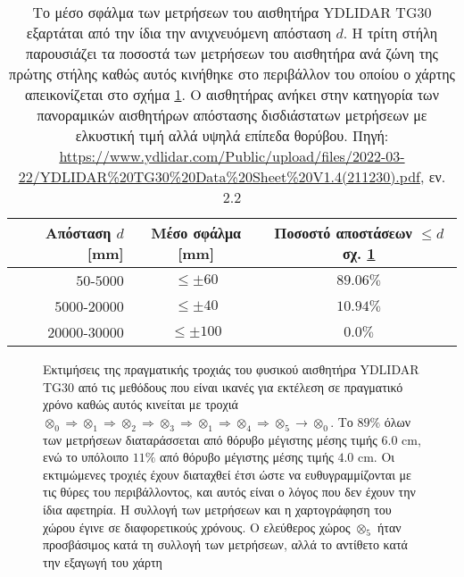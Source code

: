 \begin{table}[h]\centering \vspace{0.5cm}
  \begin{tabular}{rcc}
    Απόσταση $d$ [mm]   & Μέσο σφάλμα [mm]    & Ποσοστό αποστάσεων $\leq d$ σχ. \ref{fig:02_05_04:03} \\ \toprule
    $50$-$5000$         & $\leq \pm 60$       & $89.06\%$  \\
    $5000$-$20000$      & $\leq \pm 40$       & $10.94\%$  \\
    $20000$-$30000$     & $\leq \pm 100$      & $0.0\%$    \\  \bottomrule
  \end{tabular}
  \caption{\small Το μέσο σφάλμα των μετρήσεων του αισθητήρα YDLIDAR TG30
           εξαρτάται από την ίδια την ανιχνευόμενη απόσταση $d$. Η τρίτη στήλη
           παρουσιάζει τα ποσοστά των μετρήσεων του αισθητήρα ανά ζώνη της
           πρώτης στήλης καθώς αυτός κινήθηκε στο περιβάλλον του οποίου ο
           χάρτης απεικονίζεται στο σχήμα \ref{fig:02_05_04:03}. Ο αισθητήρας
           ανήκει στην κατηγορία των πανοραμικών αισθητήρων απόστασης
           δισδιάστατων μετρήσεων με ελκυστική τιμή αλλά υψηλά επίπεδα
           θορύβου. Πηγή: \url{https://www.ydlidar.com/Public/upload/files/2022-03-22/YDLIDAR\%20TG30\%20Data\%20Sheet\%20V1.4(211230).pdf}, εν. 2.2}
  \label{tbl:02:05_04:tg30}
\end{table}

\begin{figure}[]\centering
  
  \vspace{-0.5cm}
  \caption{\small Εκτιμήσεις της πραγματικής τροχιάς του φυσικού αισθητήρα
           YDLIDAR TG30 από τις μεθόδους που είναι ικανές για εκτέλεση σε
           πραγματικό χρόνο καθώς αυτός κινείται με τροχιά $\otimes_0
           \Rightarrow \otimes_1 \Rightarrow \otimes_2 \Rightarrow \otimes_3
           \Rightarrow \otimes_1 \Rightarrow \otimes_4 \Rightarrow \otimes_5
           \rightarrow \otimes_0$.  Το $89\%$ όλων των μετρήσεων διαταράσσεται
           από θόρυβο μέγιστης μέσης τιμής $6.0$ cm, ενώ το υπόλοιπο $11\%$ από
           θόρυβο μέγιστης μέσης τιμής $4.0$ cm. Οι εκτιμώμενες τροχιές έχουν
           διαταχθεί έτσι ώστε να ευθυγραμμίζονται με τις θύρες του
           περιβάλλοντος, και αυτός είναι ο λόγος που δεν έχουν την ίδια
           αφετηρία. Η συλλογή των μετρήσεων και η χαρτογράφηση του χώρου έγινε
           σε διαφορετικούς χρόνους. Ο ελεύθερος χώρος $\otimes_5$ ήταν
           προσβάσιμος κατά τη συλλογή των μετρήσεων, αλλά το αντίθετο κατά την
           εξαγωγή του χάρτη}
  \label{fig:02_05_04:03}
\end{figure}


